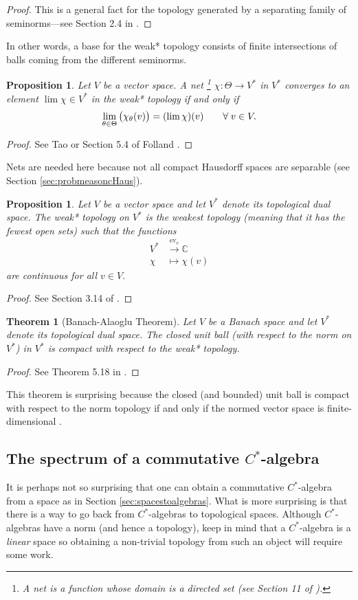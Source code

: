 \documentclass[12pt]{article}
\theoremstyle{theorem}
\newtheorem{theorem}[equation]{Theorem}
\newtheorem{proposition}[equation]{Proposition}
\theoremstyle{definition}
\numberwithin{equation}{section}
\let\C=\Chi \let\W=\Omega
\newcommand{\be}{\begin{equation}}
\newcommand{\ee}{\end{equation}}
\newcommand{\bt}{\begin{theorem}}
\newcommand{\et}{\end{theorem}}
\newcommand{\bn}{\begin{proposition}}
\newcommand{\en}{\end{proposition}}
\newcommand{\bprf}{\begin{proof}}
\newcommand{\eprf}{\end{proof}}
\newcommand{\<}{\langle}
\renewcommand{\>}{\rangle}
\def\C{{{\mathbb C}}}
\begin{document}
\bprf
This is a general fact for the topology generated by a
separating family of seminorms---see Section 2.4 in \cite{Pe89}.
\eprf

In other words, a base for the weak* topology consists of
finite intersections of balls coming from the different seminorms. 

\bn
\label{prop:weak*topologyconvergence}
Let $V$ be a vector space. A net%
\footnote{A net is a function whose domain is a directed set 
(see Section 11 of \cite{Wi04}).}
$\chi:\Theta\to V^{*}$
in $V^{*}$ converges to an element $\lim\chi\in V^{*}$ 
in the weak* topology if and only if 
\be
\lim_{\theta\in\Theta}\big(\chi_{\q}(v)\big)=(\lim\chi)(v)\qquad\forall\;v\in V.
\ee
\en

\bprf
See Tao \cite{Ta09_245B11} or Section 5.4 of Folland \cite{Fo07}.
\eprf

Nets are needed here because not all compact Hausdorff spaces
are separable (see Section \ref{sec:probmeasoncHaus}). 

\bn
Let $V$ be a vector space and let $V^{*}$ denote its topological dual space.
The weak* topology on $V^{*}$ is the weakest topology (meaning that it has
the fewest open sets) such that the functions 
\be
\begin{split}
V^{*}&\xrightarrow{\mathrm{ev}_{v}}\C\\
\chi&\mapsto
\chi(v)
\end{split}
\ee
are continuous for all $v\in V.$
\en

\bprf
See Section 3.14 of \cite{Ru91}. 
\eprf

\bt
[Banach-Alaoglu Theorem]
Let $V$ be a Banach space and let $V^{*}$ denote its topological dual space.
The closed unit ball (with respect to the norm on $V^*$)
in $V^{*}$ is compact with respect to the weak* topology. 
\et

\bprf
See Theorem 5.18 in \cite{Fo07}. 
\eprf

This theorem is surprising because the closed (and bounded) unit ball is compact
with respect to the norm topology if and only if the normed vector space 
is finite-dimensional \cite{Ta09_245B11}. 


\subsection{The spectrum of a commutative $C^*$-algebra}

It is perhaps not so surprising that one can obtain a 
commutative $C^*$-algebra from a space as in Section \ref{sec:spacestoalgebras}.
What is more surprising is that there is a way to go back
from $C^*$-algebras to topological spaces.
Although $C^*$-algebras have a norm (and hence a topology), 
keep in mind that a $C^*$-algebra is a \emph{linear} space so 
obtaining a non-trivial topology from such an object will require some work. 
\end{document}
